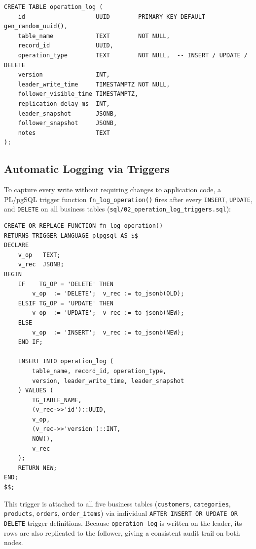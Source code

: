 \documentclass[12pt,a4paper]{article}
\begin{document}
\begin{lstlisting}[style=sqlstyle, caption={operation\_log table definition}]
CREATE TABLE operation_log (
    id                    UUID        PRIMARY KEY DEFAULT gen_random_uuid(),
    table_name            TEXT        NOT NULL,
    record_id             UUID,
    operation_type        TEXT        NOT NULL,  -- INSERT / UPDATE / DELETE
    version               INT,
    leader_write_time     TIMESTAMPTZ NOT NULL,
    follower_visible_time TIMESTAMPTZ,
    replication_delay_ms  INT,
    leader_snapshot       JSONB,
    follower_snapshot     JSONB,
    notes                 TEXT
);
\end{lstlisting}

\subsection{Automatic Logging via Triggers}

To capture every write without requiring changes to application code, a
PL/pgSQL trigger function \texttt{fn\_log\_operation()} fires after every
\texttt{INSERT}, \texttt{UPDATE}, and \texttt{DELETE} on all business tables
(\texttt{sql/02\_operation\_log\_triggers.sql}):

\begin{lstlisting}[style=sqlstyle, caption={Trigger function for automatic operation logging}]
CREATE OR REPLACE FUNCTION fn_log_operation()
RETURNS TRIGGER LANGUAGE plpgsql AS $$
DECLARE
    v_op   TEXT;
    v_rec  JSONB;
BEGIN
    IF    TG_OP = 'DELETE' THEN
        v_op  := 'DELETE';  v_rec := to_jsonb(OLD);
    ELSIF TG_OP = 'UPDATE' THEN
        v_op  := 'UPDATE';  v_rec := to_jsonb(NEW);
    ELSE
        v_op  := 'INSERT';  v_rec := to_jsonb(NEW);
    END IF;

    INSERT INTO operation_log (
        table_name, record_id, operation_type,
        version, leader_write_time, leader_snapshot
    ) VALUES (
        TG_TABLE_NAME,
        (v_rec->>'id')::UUID,
        v_op,
        (v_rec->>'version')::INT,
        NOW(),
        v_rec
    );
    RETURN NEW;
END;
$$;
\end{lstlisting}

This trigger is attached to all five business tables (\texttt{customers},
\texttt{categories}, \texttt{products}, \texttt{orders}, \texttt{order\_items})
via individual \texttt{AFTER INSERT OR UPDATE OR DELETE} trigger definitions.
Because \texttt{operation\_log} is written on the leader, its rows are also
replicated to the follower, giving a consistent audit trail on both nodes.
\end{document}
